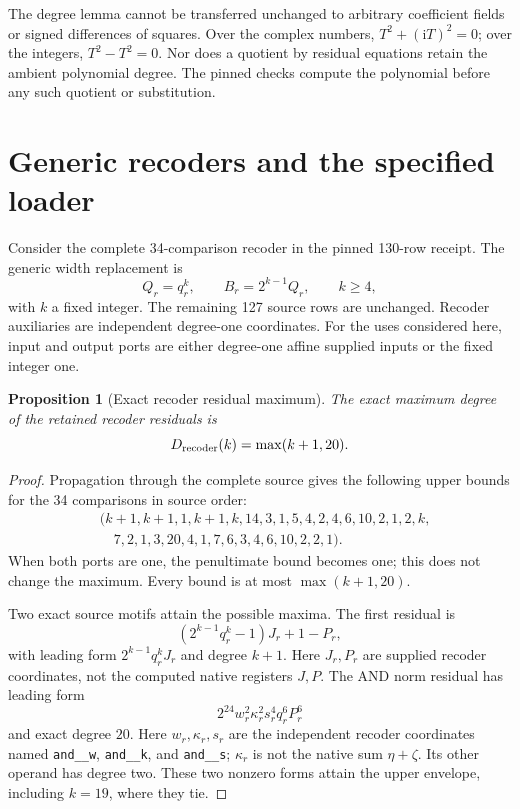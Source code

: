 \documentclass[11pt,letterpaper]{article}
\newtheorem{proposition}[theorem]{Proposition}
\theoremstyle{definition}\newtheorem{definition}[theorem]{Definition}
\theoremstyle{remark}\newtheorem{remark}[theorem]{Remark}
\newcommand{\fnameB}[1]{{\small\nolinkurl{#1}}}
\begin{document}
The degree lemma cannot be transferred unchanged to arbitrary coefficient fields or signed differences of squares. Over the complex numbers, $T^2+(\mathrm iT)^2=0$; over the integers, $T^2-T^2=0$. Nor does a quotient by residual equations retain the ambient polynomial degree. The pinned checks compute the polynomial before any such quotient or substitution.

\section{Generic recoders and the specified loader}\label{fup:dl:sec:loader}
Consider the complete 34-comparison recoder in the pinned 130-row receipt. The generic width replacement is
\[
 Q_r=q_r^k,\qquad B_r=2^{k-1}Q_r,\qquad k\ge4,
\]
with $k$ a fixed integer. The remaining 127 source rows are unchanged. Recoder auxiliaries are independent degree-one coordinates. For the uses considered here, input and output ports are either degree-one affine supplied inputs or the fixed integer one.

\begin{proposition}[Exact recoder residual maximum]\label{fup:dl:prop:recoder}
The exact maximum degree of the retained recoder residuals is
\[
 D_{\rm recoder}(k)=\max(k+1,20).
\]
\end{proposition}
\begin{proof}
Propagation through the complete source gives the following upper bounds for the 34 comparisons in source order:
\begin{align*}
 &(k+1,k+1,1,k+1,k,14,3,1,5,4,2,4,6,10,2,1,2,k,\\
 &\hspace{1em}7,2,1,3,20,4,1,7,6,3,4,6,10,2,2,1).
\end{align*}
When both ports are one, the penultimate bound becomes one; this does not change the maximum. Every bound is at most $\max(k+1,20)$.

Two exact source motifs attain the possible maxima. The first residual is
\[
 (2^{k-1}q_r^k-1)J_r+1-P_r,
\]
with leading form $2^{k-1}q_r^kJ_r$ and degree $k+1$. Here $J_r,P_r$ are supplied recoder coordinates, not the computed native registers $J,P$. The AND norm residual has leading form
\[
 2^{24}w_r^2\kappa_r^2s_r^4q_r^6P_r^6
\]
and exact degree $20$. Here $w_r,\kappa_r,s_r$ are the independent recoder coordinates named \fnameB{and__w}, \fnameB{and__k}, and \fnameB{and__s}; $\kappa_r$ is not the native sum $\eta+\zeta$. Its other operand has degree two. These two nonzero forms attain the upper envelope, including $k=19$, where they tie.
\end{proof}
\end{document}
